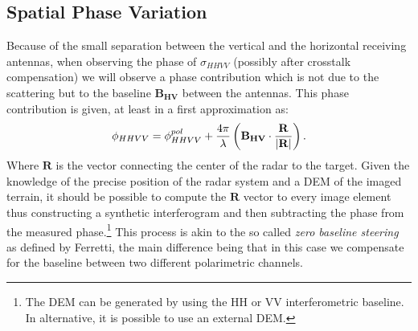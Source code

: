 \documentclass[11pt]{article}
\begin{document}
\subsection{Spatial Phase Variation}
Because of the small separation between the vertical and the horizontal receiving antennas, when observing the phase of $\sigma_{HHVV}$ (possibly after crosstalk compensation) we will observe a phase contribution which is not due to the scattering but to the baseline $\mathbf{B_{HV}}$ between the antennas. This phase contribution is given, at least in a first approximation as:
\begin{equation}
	\phi_{HHVV} = \phi_{HHVV}^{pol} + \frac{4 \pi}{\lambda} \left(\mathbf{B_{HV}} \cdot \frac{\mathbf{R}}{\left|\mathbf{R}\right|} \right).
\end{equation}
Where $\mathbf{R}$ is the vector connecting the center of the radar to the target. Given the knowledge of the precise position of the radar system and a DEM of the imaged terrain, it should be possible to compute the $\mathbf{R}$ vector to every image element thus constructing a synthetic interferogram and then subtracting the phase from the measured phase.\footnote{The DEM can be generated by using the HH or VV interferometric baseline. In alternative, it is possible to use an external  DEM.} This process is akin to the so called \emph{zero baseline steering} as defined by Ferretti\cite{898661}, the main difference being that in this case we compensate for the baseline between two different polarimetric channels.

{}
\end{document}
